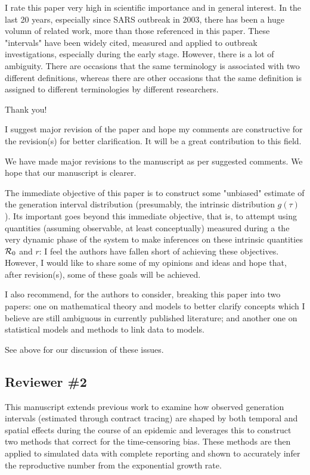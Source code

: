 \documentclass[12pt]{article}
\newcommand{\Rx}[1]{\ensuremath{{\cal R}_{#1}}}
\newcommand{\Ro}{\Rx{0}}
\newcommand{\reviewer}{\subsection*}
\newcommand{\revtext}{\textsf}
\begin{document}
\revtext{
I rate this paper very high in scientific importance and in general interest.
In the last 20 years, especially since SARS outbreak in 2003, there has
been a huge volumn of related work, more than those referenced in this
paper. These "intervals" have been widely cited, measured and applied to
outbreak investigations, especially during the early stage. However, there
is a lot of ambiguity. There are occasions that the same terminology is
associated with two different definitions, whereas there are other occasions
that the same definition is assigned to different terminologies by different
researchers.
}

Thank you!

\revtext{
I suggest major revision of the paper and hope my comments are
constructive for the revision(s) for better clarification. It will be a
great contribution to this field.
}

We have made major revisions to the manuscript as per suggested comments.
We hope that our manuscript is clearer.

\revtext{
The immediate objective of this paper is to construct some "unbiased" estimate of the generation interval distribution (presumably, the intrinsic distribution $g(\tau)$). Its important goes beyond this immediate objective, that is, to attempt using quantities (assuming observable, at least conceptually) measured during a the very dynamic
phase of the system to make inferences on these intrinsic quantities
$\Ro$ and $r$: I feel the authors have fallen short of achieving these objectives. However, I would like to share some of my opinions and ideas
and hope that, after revision(s), some of these goals will be achieved.
}

\revtext{
I also recommend, for the authors to consider, breaking this paper
into two papers: one on mathematical theory and models to better
clarify concepts which I believe are still ambiguous in currently published literature; and another one on statistical models and methods
to link data to models.
}

See above for our discussion of these issues.

\reviewer{Reviewer \#2}

\revtext{
This manuscript extends previous work to examine how observed generation intervals (estimated through contract tracing) are shaped by both temporal and spatial effects during the course of an epidemic and leverages this to construct two methods that correct for the time-censoring bias. These methods are then applied to simulated data with complete reporting and shown to accurately infer the reproductive number from the exponential growth rate.
}
\end{document}
